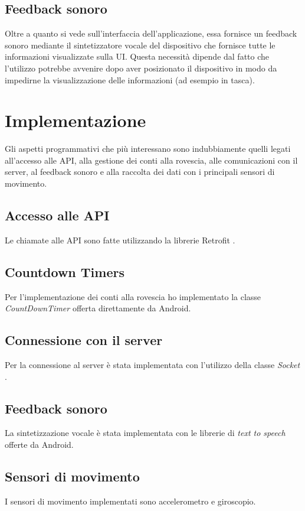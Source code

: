 \subsection{Feedback sonoro}
Oltre a quanto si vede sull'interfaccia dell'applicazione, essa fornisce un feedback sonoro mediante il sintetizzatore vocale
del dispositivo che fornisce tutte le informazioni visualizzate sulla UI. Questa necessità dipende dal fatto che l'utilizzo potrebbe avvenire 
dopo aver posizionato il dispositivo in modo da impedirne la visualizzazione delle informazioni (ad esempio in tasca).



\section{Implementazione}
Gli aspetti programmativi che più interessano sono indubbiamente quelli legati all'accesso alle API, alla gestione dei conti 
alla rovescia, alle comunicazioni con il server, al feedback sonoro e alla raccolta dei dati con i principali sensori di movimento.

\subsection{Accesso alle API}
Le chiamate alle API sono fatte utilizzando la librerie Retrofit \cite{retrofit}.


\subsection{Countdown Timers}
Per l'implementazione dei conti alla rovescia ho implementato la classe \textit{CountDownTimer} \cite{countdown}
offerta direttamente da Android.


\subsection{Connessione con il server}
Per la connessione al server è stata implementata con l'utilizzo della classe \textit{Socket} \cite{socket}.


\subsection{Feedback sonoro}
La sintetizzazione vocale è stata implementata con le librerie di \textit{text to speech} \cite{tts} offerte da Android.


\subsection{Sensori di movimento}
I sensori di movimento implementati sono accelerometro e giroscopio.


